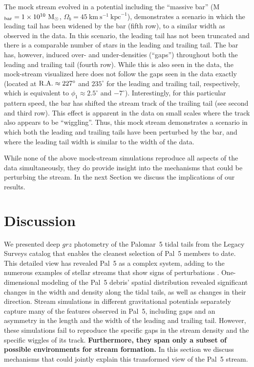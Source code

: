 \documentclass[twocolumn]{aastex62}
\newcommand{\msun}{\textrm{M}_\odot}
\newcommand{\kmskpc}{\ensuremath{\textrm{km}~\textrm{s}^{-1}~\textrm{kpc}^{-1}}}
\newcommand{\changes}[1]{{\textbf{#1}}}
\begin{document}
The mock stream evolved in a potential including the  ``massive bar'' (M$_{\rm bar} = 1\times 10^{10}~\msun$, $\Omega_b = 45~\kmskpc$), demonstrates a scenario in which the leading tail has been widened by the bar (fifth row), to a similar width as observed in the data.
In this scenario, the leading tail has not been truncated and there is a comparable number of stars in the leading and trailing tail.
The bar has, however, induced over- and under-densities (``gaps'') throughout both the leading and trailing tail (fourth row).
While this is also seen in the data, the mock-stream visualized here does not follow the gaps seen in the data exactly (located at $\rm R.A.\approx 227^\circ$ and $235^\circ$ for the leading and trailing tail, respectively, which is equivalent to $\phi_1 \approx 2.5^\circ$ and $-7^\circ$).
Interestingly, for this particular pattern speed, the bar has shifted the stream track of the trailing tail  (see second and third row).
This effect is apparent in the data on small scales where the track also appears to be ``wiggling''.
Thus, this mock stream demonstrates a scenario in which both the leading and trailing tails have been perturbed by the bar, and where the leading tail width is similar to the width of the data.

While none of the above mock-stream simulations reproduce all aspects of the data simultaneously, they do provide insight into the mechanisms that could be perturbing the stream.
In the next Section we discuss the implications of our results.


\section{Discussion}
\label{sec:discussion}
We presented deep $grz$ photometry of the Palomar~5 tidal tails from the Legacy Surveys catalog that enables the cleanest selection of Pal~5 members to date. This detailed view has revealed Pal~5 as a complex system, adding to the numerous examples of stellar streams that show signs of perturbations \citep[e.g.,][]{Sesar:2016, Price-Whelan:2018, Bonaca:2019a}.
One-dimensional modeling of the Pal~5 debris' spatial distribution revealed significant changes in the width and density along the tidal tails, as well as changes in their direction.
Stream simulations in different gravitational potentials separately capture many of the features observed in Pal~5, including gaps and an asymmetry in the length and the width of the leading and trailing tail.
However, these simulations fail to reproduce the specific gaps in the stream density and the specific wiggles of its track.
\changes{Furthermore, they span only a subset of possible environments for stream formation.}
In this section we discuss mechanisms that could jointly explain this transformed view of the Pal~5 stream.
\end{document}
